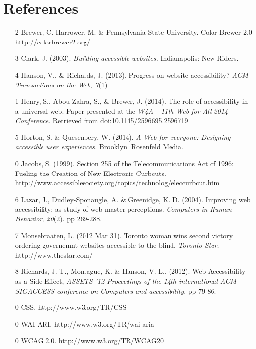 \documentclass{acm_proc_article-sp}
\begin{document}
\section{References}
\begin{itemize}
\item[2] Brewer, C. Harrower, M. \& Pennsylvania State University. Color Brewer 2.0 http://colorbrewer2.org/
\item[3] Clark, J. (2003). {\it Building accessible websites.} Indianapolis: New Riders.
\item[4] Hanson, V., \& Richards, J. (2013). Progress on website accessibility? {\it ACM Transactions on the Web, 7}(1).
\item[1] Henry, S., Abou-Zahra, S., \& Brewer, J. (2014). The role of accessibility in a universal web. Paper presented at the {\it W4A - 11th Web for All 2014 Conference}. Retrieved from doi:10.1145/2596695.2596719
\item[5] Horton, S. \& Quesenbery, W. (2014). {\it A Web for everyone: Designing accessible user experiences.} Brooklyn: Rosenfeld Media.
\item[0] Jacobs, S. (1999). Section 255 of the Telecommunications Act of 1996: Fueling the Creation of New Electronic Curbcuts.\\http://www.accessiblesociety.org/topics/technolog/eleccurbcut.htm 
\item[6] Lazar, J., Dudley-Sponaugle, A. \& Greenidge, K. D. (2004). Improving web accessibility: as study of web master perceptions. {\it Computers in Human Behavior, 20}(2). pp 269-288.
\item[7] Monsebraaten, L. (2012 Mar 31). Toronto woman wins  second victory ordering governemnt websites accessible to the blind. {\it Toronto Star.} http://www.thestar.com/
\item[8] Richards, J. T., Montague, K. \& Hanson, V. L., (2012). Web Accessibility as a Side Effect, {\it ASSETS '12 Proceedings of the 14th international ACM SIGACCESS conference on Computers and accessibility}. pp 79-86.
\item[0] CSS. http://www.w3.org/TR/CSS
\item[0] WAI-ARI. http://www.w3.org/TR/wai-aria
\item[0] WCAG 2.0. http://www.w3.org/TR/WCAG20
\end{itemize}
\end{document}
